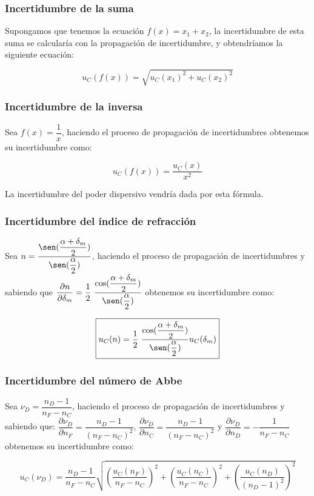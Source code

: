 \documentclass[10pt,onecolumn]{article}
\begin{document}
\subsubsection{Incertidumbre de la suma}
Supongamos que tenemos la ecuación $f(x)=x_1+x_2$, la incertidumbre de esta suma se calcularía con la propagación de incertidumbre, y obtendríamos la siguiente ecuación:

\begin{equation}
    \boxed{u_C(f(x))=\sqrt{u_C(x_1)^2+u_C(x_2)^2}}
\end{equation}

\subsubsection{Incertidumbre de la inversa}
Sea $f(x) = \dfrac{1}{x}$, haciendo el proceso de propagación de incertidumbres obtenemos su incertidumbre como:

\begin{equation}
    \boxed{u_C(f(x)) = \dfrac{u_C(x)}{x^2}}
\end{equation}

La incertidumbre del poder dispersivo vendría dada por esta fórmula.

\subsubsection{Incertidumbre del índice de refracción}
Sea $n = \dfrac{\sen(\dfrac{\alpha + \delta_m}{2})}{\sen(\dfrac{\alpha}{2})}$, haciendo el proceso de propagación de incertidumbres 
y sabiendo que 
$\dfrac{\partial n}{\partial \delta_m} = \dfrac{1}{2}\ \dfrac{\cos(\dfrac{\alpha + \delta_m}{2})}{\sen(\dfrac{\alpha}{2})}$ obtenemos su incertidumbre como:

\begin{equation}
    \boxed{u_C(n) = \dfrac{1}{2}\ \dfrac{\cos(\dfrac{\alpha + \delta_m}{2})}{\sen(\dfrac{\alpha}{2})} u_C(\delta_m)}
\end{equation}

\subsubsection{Incertidumbre del número de Abbe}
Sea $\nu_D = \dfrac{n_D - 1}{n_F - n_C}$, haciendo el proceso de propagación de incertidumbres 
y sabiendo que: 
$\dfrac{\partial \nu_D}{\partial n_F} = \dfrac{n_D - 1}{(n_F - n_C)^2}$, $\dfrac{\partial \nu_D}{\partial n_C} = \dfrac{n_D - 1}{(n_F - n_C)^2}$ y $\dfrac{\partial \nu_D}{\partial n_D} = -\dfrac{1}{n_F - n_C}$ obtenemos su incertidumbre como:

\begin{equation}
    \boxed{u_C(\nu_D) =\dfrac{n_D - 1}{n_F - n_C} \sqrt{\left(\dfrac{u_C(n_F)}{n_F - n_C} \right)^2 + \left(\dfrac{u_C(n_C)}{n_F - n_C} \right)^2 + \left(\dfrac{u_C(n_D)}{(n_D - 1)^2} \right)^2}}
\end{equation}


\end{document}
